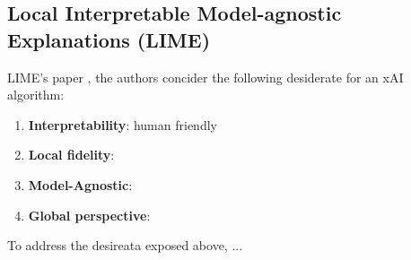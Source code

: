 \subsection{Local Interpretable Model-agnostic Explanations (LIME)}


LIME's paper \citep{ribeiro2016}, the authors concider the following desiderate for an xAI algorithm:

\begin{enumerate}

  \item \textbf{Interpretability}: human friendly
  
  \item \textbf{Local fidelity}:
  
  \item \textbf{Model-Agnostic}:
  
  \item \textbf{Global perspective}:
  
\end{enumerate}

To address the desireata exposed above, \cite{ribeiro2016}...


